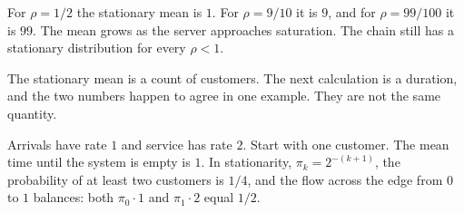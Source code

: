For $\rho=1/2$ the stationary mean is $1$. For $\rho=9/10$ it is $9$, and for $\rho=99/100$ it is $99$. The mean grows as the server approaches saturation. The chain still has a stationary distribution for every $\rho<1$.

The stationary mean is a count of customers. The next calculation is a duration, and the two numbers happen to agree in one example. They are not the same quantity.

\begin{proposition}\label{prop:emptiness}
Arrivals have rate $1$ and service has rate $2$. Start with one customer. The mean time until the system is empty is $1$. In stationarity, $\pi_k=2^{-(k+1)}$, the probability of at least two customers is $1/4$, and the flow across the edge from $0$ to $1$ balances: both $\pi_0\cdot 1$ and $\pi_1\cdot 2$ equal $1/2$.
\end{proposition}
